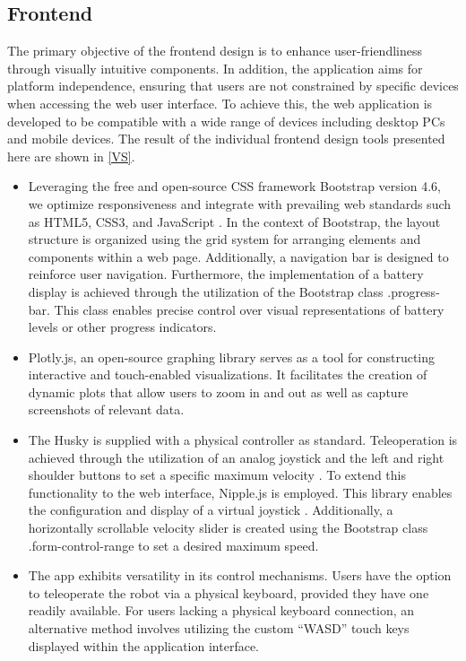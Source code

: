 \documentclass[conference]{IEEEtran}
\begin{document}
\subsection{Frontend}
The primary objective of the frontend design is to enhance user-friendliness through visually intuitive components. In addition, the application aims for platform independence, ensuring that users are not constrained by specific devices when accessing the web user interface. 
To achieve this, the web application is developed to be compatible with a wide range of devices including desktop PCs and mobile devices. The result of the individual frontend design tools presented here are shown in \ref{VS}.
\begin{itemize}
\item Leveraging the free and open-source CSS framework Bootstrap version 4.6, we optimize responsiveness and integrate with prevailing web standards such as HTML5, CSS3, and JavaScript \cite{bootstrap}. 
In the context of Bootstrap, the layout structure is organized using the grid system for arranging elements and components within a web page. 
Additionally, a navigation bar is designed to reinforce user navigation.
Furthermore, the implementation of a battery display is achieved through the utilization of the Bootstrap class .progress-bar. 
This class enables precise control over visual representations of battery levels or other progress indicators.
\item Plotly.js, an open-source graphing library serves as a tool for constructing interactive and touch-enabled visualizations. It facilitates the creation of dynamic plots that allow users to zoom in and out as well as capture screenshots of relevant data. \cite{plotly}
\item The Husky is supplied with a physical controller as standard. Teleoperation is achieved through the utilization of an analog joystick and the left and right shoulder buttons to set a specific maximum velocity \cite{huskydriving}.
To extend this functionality to the web interface, Nipple.js is employed. This library enables the configuration and display of a virtual joystick \cite{nipplejs}. Additionally, a horizontally scrollable velocity slider is created using the Bootstrap class .form-control-range to set a desired maximum speed.
\item The app exhibits versatility in its control mechanisms. Users have the option to teleoperate the robot via a physical keyboard, provided they have one readily available. For users lacking a physical keyboard connection, an alternative method involves utilizing the custom “WASD” touch keys displayed within the application interface. 

\end{itemize}
\end{document}
